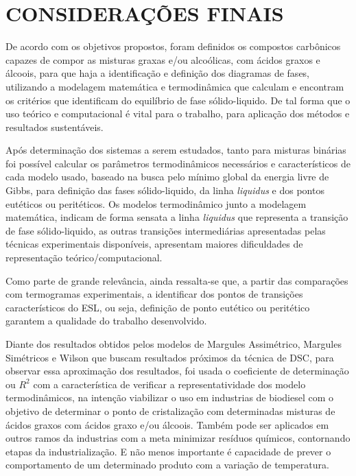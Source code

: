 
\chapter{CONSIDERAÇÕES FINAIS}
\label{chap:conclusao}

De acordo com os objetivos propostos, foram definidos os compostos carbônicos capazes de compor as misturas graxas e/ou alcoólicas, com ácidos graxos e álcoois, para que haja a identificação e definição dos diagramas de fases, utilizando a modelagem matemática e termodinâmica que calculam e encontram os critérios que identificam do equilíbrio de fase sólido-liquido. De tal forma que o uso teórico e computacional é vital para o trabalho, para aplicação dos métodos e resultados sustentáveis.

Após determinação dos sistemas a serem estudados, tanto para misturas binárias foi possível calcular os parâmetros termodinâmicos necessários e característicos de cada modelo usado, baseado na busca pelo mínimo global da energia livre de Gibbs, para definição das fases sólido-liquido, da linha \textit{liquidus} e dos pontos eutéticos ou peritéticos. Os modelos termodinâmico junto a modelagem matemática, indicam de forma sensata a linha \textit{liquidus} que  representa a transição de fase sólido-liquido, as outras transições intermediárias apresentadas pelas técnicas experimentais disponíveis, apresentam maiores dificuldades de representação teórico/computacional.

Como parte de grande relevância, ainda ressalta-se que, a partir das comparações com termogramas experimentais, a identificar dos pontos de transições característicos do ESL, ou seja, definição de ponto eutético ou peritético garantem a qualidade do trabalho desenvolvido.

Diante dos resultados obtidos pelos modelos de Margules Assimétrico, Margules Simétricos e Wilson que buscam resultados próximos da técnica de DSC, para observar essa aproximação dos resultados, foi usada o coeficiente de determinação ou $R^2$ com a característica de verificar a representatividade dos modelo termodinâmicos, na intenção viabilizar o uso em industrias de biodiesel com o objetivo de determinar o ponto de cristalização com determinadas misturas de ácidos graxos com ácidos graxo e/ou álcoois. Também pode ser aplicados em outros ramos da industrias com a meta minimizar resíduos químicos, contornando etapas da industrialização. E não menos importante é capacidade de prever o comportamento de um determinado produto com a variação de temperatura.

